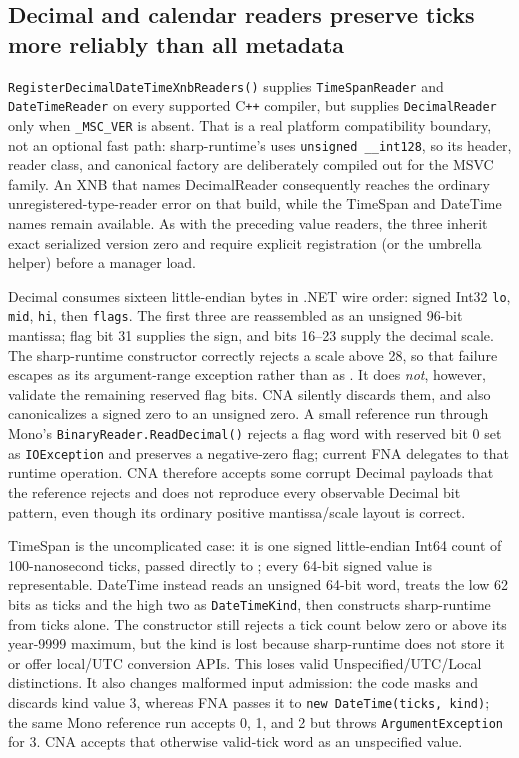 \subsection{Decimal and calendar readers preserve ticks more reliably than all metadata}
\label{sec:xnb-decimal-datetime-reader-contract}

\texttt{RegisterDecimalDateTimeXnbReaders()} supplies \texttt{TimeSpanReader} and
\texttt{DateTimeReader} on every supported C\texttt{++} compiler, but supplies
\texttt{DecimalReader} only when \texttt{\_MSC\_VER} is absent. That is a real platform
compatibility boundary, not an optional fast path: sharp-runtime's  uses
\texttt{unsigned \_\_int128}, so its header, reader class, and canonical factory are deliberately
compiled out for the MSVC family. An XNB that names DecimalReader consequently reaches the ordinary
unregistered-type-reader error on that build, while the TimeSpan and DateTime names remain
available. As with the preceding value readers, the three inherit exact serialized version zero
and require explicit registration (or the umbrella helper) before a manager load.

Decimal consumes sixteen little-endian bytes in .NET wire order: signed Int32 \texttt{lo},
\texttt{mid}, \texttt{hi}, then \texttt{flags}. The first three are reassembled as an unsigned
96-bit mantissa; flag bit 31 supplies the sign, and bits 16--23 supply the decimal scale. The
sharp-runtime  constructor correctly rejects a scale above 28, so that failure
escapes as its argument-range exception rather than as . It does
\emph{not}, however, validate the remaining reserved flag bits. CNA silently discards them, and
also canonicalizes a signed zero to an unsigned zero. A small reference run through Mono's
\texttt{BinaryReader.ReadDecimal()} rejects a flag word with reserved bit 0 set as
\texttt{IOException} and preserves a negative-zero flag; current FNA delegates to that runtime
operation. CNA therefore accepts some corrupt Decimal payloads that the reference rejects and
does not reproduce every observable Decimal bit pattern, even though its ordinary positive
mantissa/scale layout is correct.

TimeSpan is the uncomplicated case: it is one signed little-endian Int64 count of 100-nanosecond
ticks, passed directly to ; every 64-bit signed value is representable. DateTime
instead reads an unsigned 64-bit word, treats the low 62 bits as ticks and the high two as
\texttt{DateTimeKind}, then constructs sharp-runtime  from ticks alone. The
constructor still rejects a tick count below zero or above its year-9999 maximum, but the kind is
lost because sharp-runtime does not store it or offer local/UTC conversion APIs. This loses valid
Unspecified/UTC/Local distinctions. It also changes malformed input admission: the code masks and
discards kind value 3, whereas FNA passes it to \texttt{new DateTime(ticks, kind)}; the same Mono
reference run accepts 0, 1, and 2 but throws \texttt{ArgumentException} for 3. CNA accepts that
otherwise valid-tick word as an unspecified value.

